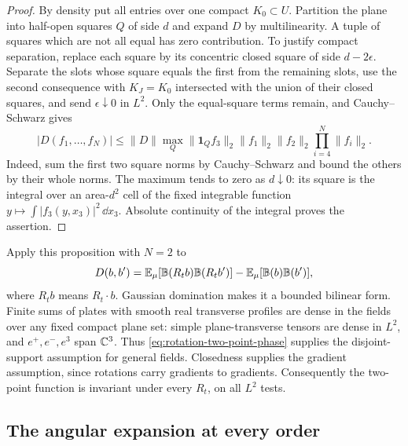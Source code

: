 \begin{proof}
By density put all entries over one compact $K_0\subset U$.
Partition the plane into half-open squares $Q$ of side $d$ and
expand $D$ by multilinearity. A tuple of squares which are not
all equal has zero contribution. To justify compact separation,
replace each square by its concentric closed square of side
$d-2\epsilon$. Separate the slots whose square equals the first
from the remaining slots, use the second consequence with
$K_J=K_0$ intersected with the union of their closed squares,
and send $\epsilon\downarrow0$ in $L^2$.
Only the equal-square terms remain, and Cauchy--Schwarz gives
\[
 |D(f_1,\ldots,f_N)|
 \le\|D\|\max_Q\|\mathbf1_Qf_3\|_2
       \|f_1\|_2\|f_2\|_2\prod_{i=4}^N\|f_i\|_2.
\]
Indeed, sum the first two square norms by Cauchy--Schwarz and
bound the others by their whole norms. The maximum tends to
zero as $d\downarrow0$: its square is the integral over an
area-$d^2$ cell of the fixed integrable function
$y\mapsto\int|f_3(y,x_3)|^2\,\dd x_3$.
Absolute continuity of the integral proves the assertion.
\end{proof}

Apply this proposition with $N=2$ to
\[
 D(b,b')=\mathbb E_\mu[\mathbb B(R_tb)\mathbb B(R_tb')]
              -\mathbb E_\mu[\mathbb B(b)\mathbb B(b')],
\]
where $R_tb$ means $R_t\cdot b$. Gaussian domination makes it a
bounded bilinear form. Finite sums of plates with smooth real
transverse profiles are dense in the fields over any fixed
compact plane set: simple plane-transverse tensors are dense
in $L^2$, and $e^+,e^-,e^3$ span $\mathbb C^3$.
Thus \eqref{eq:rotation-two-point-phase} supplies the disjoint-support
assumption for general fields. Closedness supplies the gradient
assumption, since rotations carry gradients to gradients.
Consequently the two-point function is invariant under every
$R_t$, on all $L^2$ tests.

\subsection{The angular expansion at every order}
\label{subsec:rotation-angular-expansion}

